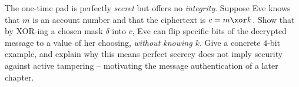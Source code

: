 \begin{exercise}
\label{ch09:ex-malleable}
The one-time pad is perfectly \emph{secret} but offers no \emph{integrity}. Suppose Eve knows that $m$ is an account number and that the ciphertext is $c = m \xor k$. Show that by XOR-ing a chosen mask $\delta$ into $c$, Eve can flip specific bits of the decrypted message to a value of her choosing, \emph{without knowing $k$}. Give a concrete $4$-bit example, and explain why this means perfect secrecy does not imply security against active tampering -- motivating the message authentication of a later chapter.
\end{exercise}
